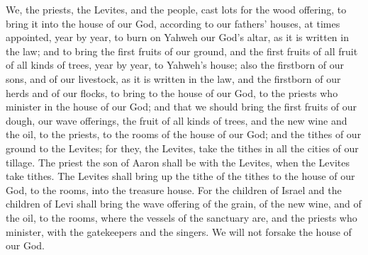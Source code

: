 {We, the priests, the Levites, and the people, cast lots for the wood offering, to bring it into the house of our God, according to our fathers’ houses, at times appointed, year by year, to burn on Yahweh our God’s altar, as it is written in the law;
and to bring the first fruits of our ground, and the first fruits of all fruit of all kinds of trees, year by year, to Yahweh’s house;
also the firstborn of our sons, and of our livestock, as it is written in the law, and the firstborn of our herds and of our flocks, to bring to the house of our God, to the priests who minister in the house of our God;
and that we should bring the first fruits of our dough, our wave offerings, the fruit of all kinds of trees, and the new wine and the oil, to the priests, to the rooms of the house of our God; and the tithes of our ground to the Levites; for they, the Levites, take the tithes in all the cities of our tillage.
The priest the son of Aaron shall be with the Levites, when the Levites take tithes. The Levites shall bring up the tithe of the tithes to the house of our God, to the rooms, into the treasure house.
For the children of Israel and the children of Levi shall bring the wave offering of the grain, of the new wine, and of the oil, to the rooms, where the vessels of the sanctuary are, and the priests who minister, with the gatekeepers and the singers. We will not forsake the house of our God.

}
